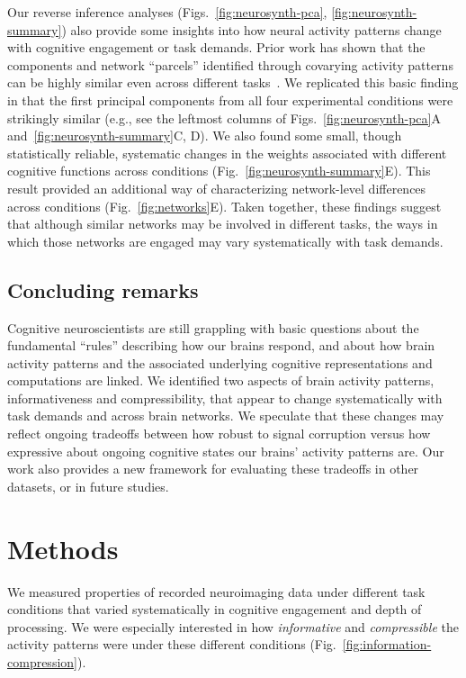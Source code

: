 \documentclass[english, 11pt]{article}
\begin{document}
Our reverse inference analyses (Figs.~\ref{fig:neurosynth-pca},
\ref{fig:neurosynth-summary}) also provide some insights into how neural
activity patterns change with cognitive engagement or task demands. Prior work
has shown that the components and network ``parcels'' identified through
covarying activity patterns can be highly similar even across different
tasks~\citep[including ``rest,'' e.g.,][]{SmitEtal09, LairEtal11}. We
replicated this basic finding in that the first principal components from all
four experimental conditions were strikingly similar (e.g., see the leftmost
columns of Figs.~\ref{fig:neurosynth-pca}A and~\ref{fig:neurosynth-summary}C,
D). We also found some small, though statistically reliable, systematic changes
in the weights associated with different cognitive functions across conditions
(Fig.~\ref{fig:neurosynth-summary}E). This result provided an additional way of
characterizing network-level differences across conditions
(Fig.~\ref{fig:networks}E).  Taken together, these findings suggest that although
similar networks may be involved in different tasks, the ways in which those
networks are engaged may vary systematically with task demands.

\subsection*{Concluding remarks}

Cognitive neuroscientists are still grappling with basic questions about the
fundamental ``rules'' describing how our brains respond, and about how brain
activity patterns and the associated underlying cognitive representations and
computations are linked. We identified two aspects of brain activity patterns,
informativeness and compressibility, that appear to change systematically with
task demands and across brain networks. We speculate that these changes may
reflect ongoing tradeoffs between how robust to signal corruption versus how
expressive about ongoing cognitive states our brains' activity patterns are.
Our work also provides a new framework for evaluating these tradeoffs in other
datasets, or in future studies.

\section*{Methods}

We measured properties of recorded neuroimaging data under different task
conditions that varied systematically in cognitive engagement and depth of
processing. We were especially interested in how \textit{informative} and
\textit{compressible} the activity patterns were under these different
conditions (Fig.~\ref{fig:information-compression}).
\end{document}
